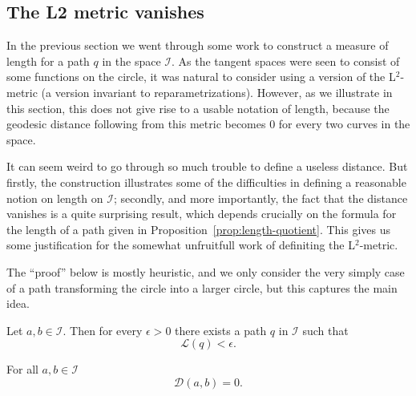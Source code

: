 \message{ !name(mainfile.tex)}\documentclass[a4,danish]{article}
\begin{document}
\subsection{The L2 metric vanishes}
\label{sec:l2-metric-vanishes}

In the previous section we went through some work to construct a measure of length for a path $q$ in the space $\mathcal{I}$. As the tangent spaces were seen to consist of some functions on the circle, it was natural to consider using a version of the L$^2$-metric (a version invariant to reparametrizations). However, as we illustrate in this section, this does not give rise to a usable notation of length, because the geodesic distance following from this metric becomes 0 for every two curves in the space.

It can seem weird to go through so much trouble to define a useless distance. But firstly, the construction illustrates some of the difficulties in defining a reasonable notion on length on $\mathcal{I}$; secondly, and more importantly, the fact that the distance vanishes is a quite surprising result, which depends crucially on the formula for the length of a path given in Proposition~\ref{prop:length-quotient}. This gives us some justification for the somewhat unfruitfull work of definiting the L$^2$-metric.

The ``proof'' below is mostly heuristic, and we only consider the very simply case of a path transforming the circle into a larger circle, but this captures the main idea.
\begin{theorem}
  \label{theorem:l2-metric-vanishes}
  Let $a,b \in \mathcal{I}$. Then for every $\epsilon >0 $ there exists a path $q$ in $\mathcal{I}$ such that
  \begin{equation*}
    \mathcal{L}(q) < \epsilon.
  \end{equation*}
\end{theorem}
\begin{corollary}
  For all $a,b \in \mathcal{I}$
  \begin{equation*}
    \mathcal{D}(a,b) = 0.
  \end{equation*}
\end{corollary}
\end{document}
